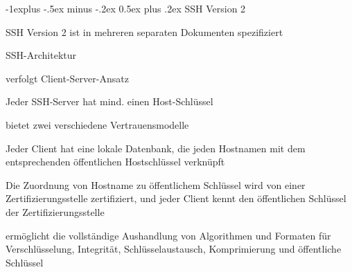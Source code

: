 \documentclass[a4paper]{article}
\makeatletter
\renewcommand{\subsection}{\@startsection{subsection}{2}{0mm}%
 {-1explus -.5ex minus -.2ex}%
 {0.5ex plus .2ex}%
 {\normalfont\normalsize\bfseries}}
\makeatother
\begin{document}
\begin{multicols}{3}
      \subsection{SSH Version 2}
      \begin{itemize*}
            \item SSH Version 2 ist in mehreren separaten Dokumenten spezifiziert
            \item SSH-Architektur
            \begin{itemize*}
                  \item verfolgt Client-Server-Ansatz
                  \item Jeder SSH-Server hat mind. einen Host-Schlüssel
                  \item bietet zwei verschiedene Vertrauensmodelle
            \end{itemize*}
            \begin{enumerate*}
                  \item Jeder Client hat eine lokale Datenbank, die jeden Hostnamen mit dem entsprechenden öffentlichen Hostschlüssel verknüpft
                  \item Die Zuordnung von Hostname zu öffentlichem Schlüssel wird von einer Zertifizierungsstelle zertifiziert, und jeder Client kennt den öffentlichen Schlüssel der Zertifizierungsstelle
            \end{enumerate*}
            \item ermöglicht die vollständige Aushandlung von Algorithmen und Formaten für Verschlüsselung, Integrität, Schlüsselaustausch, Komprimierung und öffentliche Schlüssel
      \end{itemize*}


\end{multicols}
\end{document}
